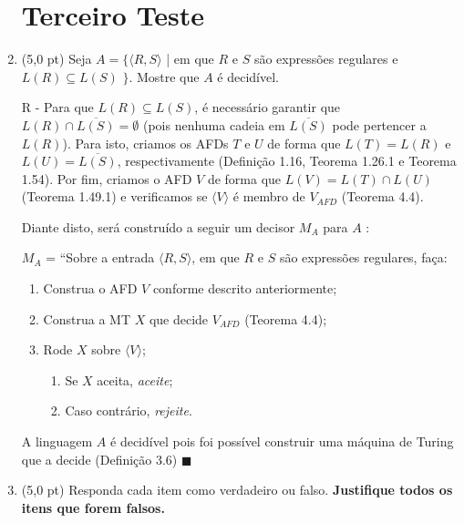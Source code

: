 \documentclass[12pt,a4paper,oneside]{article}
\begin{document}
\begin{enumerate}
	
	\section*{Terceiro Teste}
	
	\item (5,0 pt) Seja $A = \{ \langle R, S \rangle$ | em que $R$ e $S$ são expressões regulares e $L(R) \subseteq L(S)$ $\}$. Mostre que $A$ é decidível.
	
	\vspace{0.3cm}
	
	{\color{verde}
		R - Para que $L(R) \subseteq L(S)$, é necessário garantir que $L(R) \cap \overline{L(S)} = \emptyset$ (pois nenhuma cadeia em $\overline{L(S)}$ pode pertencer a $L(R)$). Para isto, criamos os AFDs $T$ e $U$ de forma que $L(T) = L(R)$ e $L(U) = \overline{L(S)}$, respectivamente (Definição 1.16, Teorema 1.26.1 e Teorema 1.54). Por fim, criamos o AFD $V$ de forma que $L(V) = L(T) \cap L(U)$ (Teorema 1.49.1) e verificamos se $\langle V \rangle$ é membro de $V_{AFD}$ (Teorema 4.4).
		
		Diante disto, será construído a seguir um decisor $M_A$ para $A$ :
		
		$M_A$ = ``Sobre a entrada $\langle R, S \rangle$, em que $R$ e $S$ são expressões regulares, faça:
			\begin{enumerate}
				\item Construa o AFD $V$ conforme descrito anteriormente;
				\item Construa a MT $X$ que decide $V_{AFD}$ (Teorema 4.4);
				\item Rode $X$ sobre $\langle V \rangle$;
				\begin{enumerate}
					\item Se $X$ aceita, {\it aceite};
					\item Caso contrário, {\it rejeite}.
				\end{enumerate}					
			\end{enumerate}
		
		A linguagem $A$ é decidível pois foi possível construir uma máquina de Turing que a decide (Definição 3.6) $\blacksquare$
		
	}
	
	\newpage
	
	\item (5,0 pt) Responda cada item como verdadeiro ou falso. {\bf Justifique todos os itens que forem falsos.}


\end{enumerate}
\end{document}
